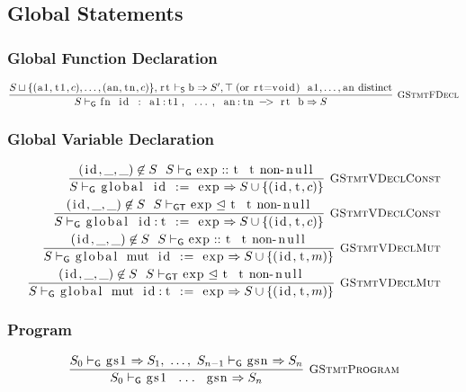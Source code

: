 \documentclass{article}
\newcommand{\code}[1]{\lstinline[columns=fixed]{#1}}
\newcommand{\drmrule}[5]{\frac{#1}{#2\vdash_{\mathsf{#3}}#4}\textsc{\ \small{#5}}}
\newcommand{\ruleapp}[1]{\vdash_{\mathsf{#1}}}
\newcommand{\mc}[1]{\textnormal{\code{#1}}}
\begin{document}
		\subsection{Global Statements}
		
			\subsubsection{Global Function Declaration}
			
				\begin{align*}
					\drmrule{S\sqcup\{(\mc{a1},\mc{t1},c),\dots,(\mc{an},\mc{tn},c)\},\mc{rt} \ruleapp{S} \mc{b} \Rightarrow S',\top\;(\textnormal{or \code{rt=void}}) \ \ \mc{a1},\dots,\mc{an} \textnormal{ distinct}}{S}{G}{\mc{fn id : a1:t1, ..., an:tn -> rt b} \Rightarrow S}{GStmtFDecl}
				\end{align*}
			
			\subsubsection{Global Variable Declaration}
			
				\begin{align*}
					\drmrule{(\mc{id},\_,\_) \not\in S\ \ S\ruleapp{G}\mc{exp} :: \mc{t}\ \ \mc{t}\textnormal{ non-\code{null}}}{S}{G}{\mc{global id := exp} \Rightarrow S\cup\{(\mc{id},\mc{t},c)\}}{GStmtVDeclConst}\\
					\drmrule{(\mc{id},\_,\_) \not\in S\ \ S\ruleapp{GT}\mc{exp}\trianglelefteq\mc{t}\ \ \mc{t}\textnormal{ non-\code{null}}}{S}{G}{\mc{global id:t := exp} \Rightarrow S\cup\{(\mc{id},\mc{t},c)\}}{GStmtVDeclConst}\\
					\drmrule{(\mc{id},\_,\_) \not\in S\ \ S\ruleapp{G}\mc{exp} :: \mc{t}\ \ \mc{t}\textnormal{ non-\code{null}}}{S}{G}{\mc{global mut id := exp} \Rightarrow S\cup\{(\mc{id},\mc{t},m)\}}{GStmtVDeclMut}\\
					\drmrule{(\mc{id},\_,\_) \not\in S\ \ S\ruleapp{GT}\mc{exp}\trianglelefteq\mc{t}\ \ \mc{t}\textnormal{ non-\code{null}}}{S}{G}{\mc{global mut id:t := exp} \Rightarrow S\cup\{(\mc{id},\mc{t},m)\}}{GStmtVDeclMut}
				\end{align*}
			
			\subsubsection{Program}
			
				\begin{align*}
					\drmrule{S_0 \ruleapp{G} \mc{gs1} \Rightarrow S_1,\ \dots,\ S_{n-1} \ruleapp{G} \mc{gsn} \Rightarrow S_n}{S_0}{G}{\mc{gs1 ... gsn} \Rightarrow S_n}{GStmtProgram}
				\end{align*}
				
\end{document}

